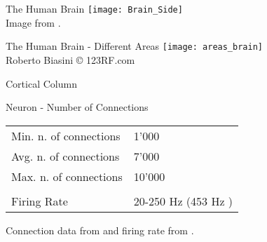 \begin{frame}[c]{The Human Brain}
    \texttt{[image: Brain\_Side]} \\
    \normalsize
    Image from \cite{figsidebrain}.
\end{frame}


\begin{frame}[c]{The Human Brain - Different Areas}
    \texttt{[image: areas\_brain]} \\
    \normalsize
    Roberto Biasini © 123RF.com
\end{frame}


\begin{frame}[c]{Cortical Column}
\end{frame}



\begin{frame}[c]{Neuron - Number of Connections}
    \pause
    \vfill %
    \begin{tabular}{ll}
        Min. n. of connections \phantom{AAA} & 1'000 \\
        Avg. n. of connections & 7'000 \\
        Max. n. of connections & 10'000 \\ \\ \pause
        Firing Rate & 20-250 Hz (453 Hz \cite{wang2016firing}) \\
    \end{tabular}
    \newline
    \vfill
    \small
    Connection data from \cite{herculano2009human} and firing rate from \cite{impact2015firing}.
\end{frame}


